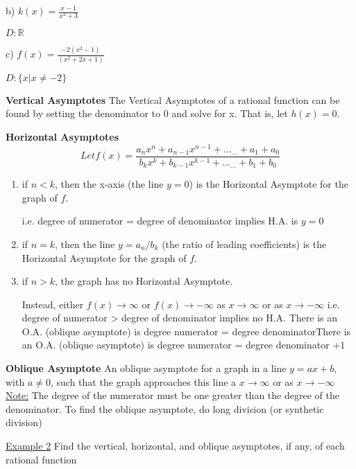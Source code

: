 \documentclass{report}
\begin{document}
  \bigbreak \bigbreak
  \begin{large}
  \noindent b) $k(x) = \frac{x-1}{x^2+3}$
  \end{large}
  \bigbreak
  $D: \mathbb{R}$
  \bigbreak \bigbreak
  \begin{large}
    \noindent c) $f(x) = \frac{-2(x^2-1)}{(x^2+2x+1)}$
  \end{large}
  \bigbreak
  $D: \{x|x\neq{-2}\}$
  \bigbreak \bigbreak
  \begin{large}
    \noindent\textbf{Vertical Asymptotes}
    \bigbreak
    \noindent The Vertical Asymptotes of a rational function can be found by setting the denominator to 0 and solve for x. That is, let $h(x)=0$.
  \end{large}
  \bigbreak \bigbreak 
  \begin{large}
    \noindent \textbf{Horizontal Asymptotes} 
    \bigbreak
    $$Let f(x) = \frac{a_nx^n+a_{n-1}x^{n-1}+..._{...}+a_1+a_0}{b_kx^k+b_{k-1}x^{k-1}+..._{...}+b_1+b_0}$$

  \end{large}
  \bigbreak
  \begin{normalsize}
  \begin{enumerate}
    \item if $n<k$, then the x-axis (the line $y=0$) is the Horizontal Asymptote for the graph of $f$.

    i.e. degree of numerator = degree of denominator implies H.A. is $y=0$
  \item if $n=k$, then the line $y=a_n/b_k$ (the ratio of leading coefficients) is the Horizontal Asymptote for the graph of $f$.
  \item if $n>k$, the graph has no Horizontal Asymptote.

  Instead, either $f(x)\to\infty$ or $f(x)\to-\infty$ as $x\to\infty$ or as $x\to-\infty$
  \bigbreak 
  i.e. degree of numerator > degree of denominator implies no H.A.
  \bigbreak
  There is an O.A. (oblique asymptote) is degree numerator = degree denominatorThere is an O.A. (oblique asymptote) is degree numerator = degree denominator $+ 1$

    
  \end{enumerate}
  \end{normalsize}
  \bigbreak \bigbreak
  \begin{large}
  
  \noindent \textbf{Oblique Asymptote}
  \bigbreak 
  \noindent An oblique asymptote for a graph in a line $y=ax+b$, with $a\neq{0}$, such that the graph approaches this line a $x\to\infty$ or as $x\to-\infty$
  \bigbreak
  \noindent \underline{Note:}
  \noindent The degree of the numerator must be one greater than the degree of the denominator. To find the oblique asymptote, do long division (or synthetic division)
  \end{large}
  \bigbreak \bigbreak
  \begin{large}
    \noindent \underline{Example 2}
    Find the vertical, horizontal, and oblique asymptotes, if any, of each rational function
  \end{large} 
    \bigbreak
\end{document}
